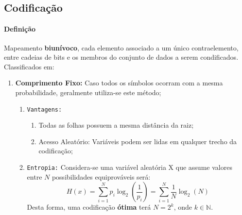 \documentclass{article}
\begin{document}
        \subsection{Codificação}
            \paragraph{Definição}Mapeamento \textbf{biunívoco}, cada elemento associado a um único contraelemento, entre cadeias de bits e os membros do conjunto de dados a serem condificados. Classificados em:
                \begin{enumerate}[rightmargin = \leftmargin]
                    \item \textbf{Comprimento Fixo:} Caso todos os símbolos ocorram com a mesma probabilidade, geralmente utiliza-se este método;
                        \begin{enumerate}[noitemsep, rightmargin = \leftmargin]
                            \item \texttt{Vantagens:}
                                \begin{enumerate}[noitemsep, rightmargin = \leftmargin]
                                    \item Todas as folhas possuem a mesma distância da raiz;
                                    \item Acesso Aleatório: Variáveis podem ser lidas em qualquer trecho da codificação;
                                \end{enumerate}

                            \item \texttt{Entropia:} Considera-se uma variável aleatória X que assume valores entre $N$ possibilidades equiprováveis será:
                                \begin{equation}
                                    \boxed{
                                        H(x) = \sum_{i=1}^{N}p_{i}\log_{2}\left(\frac{1}{p_{i}}\right) = \sum_{i=1}^{N}\frac{1}{N}\log_{2}(N)
                                    }
                                \end{equation}
                            Desta forma, uma codificação \textbf{ótima} terá $N = 2^{k}$, onde $k \in \mathbb{N}$.
                        \end{enumerate}


\end{enumerate}
\end{document}
